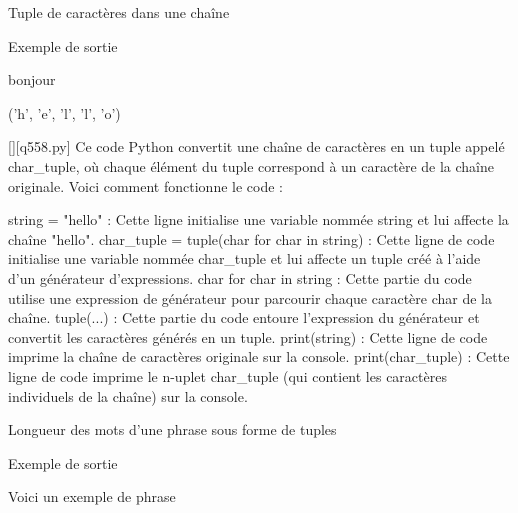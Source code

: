         \question
        Tuple de caractères dans une chaîne

Exemple de sortie

bonjour

('h', 'e', 'l', 'l', 'o')
        \par
        \begin{solution}
            \renewcommand{\nomfichier}{q558.py}
            \pythonfile{\chemincode \nomfichier}[][\nomfichier]
            Ce code Python convertit une chaîne de caractères en un tuple appelé char_tuple, où chaque élément du tuple correspond à un caractère de la chaîne originale. Voici comment fonctionne le code :

    string = "hello" : Cette ligne initialise une variable nommée string et lui affecte la chaîne "hello".
    char_tuple = tuple(char for char in string) : Cette ligne de code initialise une variable nommée char_tuple et lui affecte un tuple créé à l'aide d'un générateur d'expressions.
        char for char in string : Cette partie du code utilise une expression de générateur pour parcourir chaque caractère char de la chaîne.
        tuple(...) : Cette partie du code entoure l'expression du générateur et convertit les caractères générés en un tuple.
    print(string) : Cette ligne de code imprime la chaîne de caractères originale sur la console.
    print(char_tuple) : Cette ligne de code imprime le n-uplet char_tuple (qui contient les caractères individuels de la chaîne) sur la console.
        \end{solution}
        

        \question
        Longueur des mots d'une phrase sous forme de tuples

Exemple de sortie

Voici un exemple de phrase

